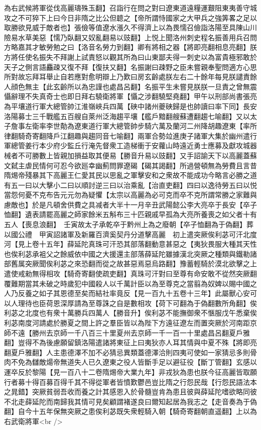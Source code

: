 為右武候將軍從伐高麗璹殊玉翻】召詣行在問之對曰遼東道遠糧運艱阻東夷善守城攻之不可猝下上曰今日非隋之比公但聼之【帝所謂恃國家之大甲兵之強筭畧之足以取勝欲見威于敵者也】張儉等值遼水漲久不得濟上以為畏懦召儉詣洛陽至具陳山川險易水草美惡【懦乃臥翻又奴亂翻易以豉翻】上悦上聞洛州刺史程名振善用兵召問方略嘉其才敏勞勉之曰【洛音名勞力到翻】卿有將相之器【將即亮翻相息亮翻】朕方將任使名振失不拜謝上試責怒以觀其所為曰山東鄙夫得一刺史以為富貴極邪敢於天子之側言語麤疎又復不拜【復扶又翻】名振謝曰疎野之臣未嘗親奉聖問適方心思所對故忘拜耳舉止自若應對愈明辯上乃歎曰房玄齡處朕左右二十餘年每見朕譴責餘人顔色無主【此玄齡所以為忠謹也處昌呂翻】名振平生未嘗見朕朕一旦責之曾無震懾辭理不失真奇士也即日拜右驍衛將軍【懾之涉翻驍堅堯翻】甲午以刑部尚書張亮為平壤道行軍大總管帥江淮嶺峽兵四萬【硤中諸州夔硤歸是也帥讀曰率下同】長安洛陽募士三千戰艦五百艘自萊州泛海趨平壤【艦戶黯翻艘蘇遭翻趨七喻翻】又以太子詹事左衛率李世勣為遼東道行軍大總管帥步騎六萬及蘭河二州降胡趣遼東【率所律翻騎奇寄翻降戶江翻趣與趨同音七喻翻】兩軍合勢竝進庚子諸軍大集於幽州遣行軍總管姜行本少府少監丘行淹先督衆工造梯衝于安蘿山時遠近勇士應募及獻攻城器械者不可勝數上皆親加損益取其便易【勝音升易以豉翻】又手詔諭天下以高麗蓋蘇文弑主虐民情何可忍今欲廵幸幽薊問罪遼碣【碣其謁翻】所過營頓無為勞費且言昔隋焬帝殘暴其下高麗王仁愛其民以思亂之軍擊安和之衆故不能成功今略言必勝之道有五一曰以大擊小二曰以順討逆三曰以治乘亂【治直吏翻】四曰以逸待勞五曰以悦當怨何憂不克布告元元勿為疑懼【太宗以高麗為必可克而卒不克所謂常勝之家難與慮敵也】於是凡頓舍供費之具减者大半十一月辛丑武陽懿公李大亮卒于長安【卒子恤翻】遺表請罷高麗之師家餘米五斛布三十匹親戚早孤為大亮所養喪之如父者十有五人【喪息浪翻】　壬寅故太子承乾卒于黔州上為之廢朝【卒子恤翻為于偽翻】葬以國公禮　甲寅詔諸軍及新羅百濟奚契丹分道擊高麗　初上遣突厥俟利苾可汗北度河【見上卷十五年】薛延陀真珠可汗恐其部落翻動意甚惡之【夷狄畏服大種其天性也俟利苾承袓父之餘威依中國之大援還主部落薛延陀雖據漢北突厥之種類與鐵勒諸部舊属突厥聞俟利苾之來恐翻而從之故甚惡焉惡烏路翻】豫蓄輕騎於漠北欲擊之上遣使戒勑無得相攻【騎奇寄翻使疏吏翻】真珠可汗對曰至尊有命安敢不從然突厥翻覆難期當其未破之時歲犯中國殺人以千萬計臣以為至尊克之當翦為奴婢以賜中國之人乃反養之如子其恩德至矣而結社率竟反【見一百九十五卷十三年】此屬獸心安可以人理待也臣荷恩深厚請為至尊誅之自是數相攻【荷下可翻為于偽翻數所角翻】俟利苾之北度也有衆十萬勝兵四萬人【勝音升】俟利苾不能撫御衆不愜服戊午悉棄俟利苾南度河請處於勝夏之間上許之羣臣皆以為陛下方遠征遼左而置突厥於河南距京師不遠【勝州去京師一千八百三十里夏州去京師一千一百一十里處昌呂翻夏戶雅翻】豈得不為後慮願留鎮洛陽遣諸將東征上曰夷狄亦人耳其情與中夏不殊【將即亮翻夏戶雅翻】人主患德澤不加不必猜忌異類蓋德澤洽則四夷可使如一家猜忌多則骨肉不免為讎敵煬帝無道失人已久遼東之役人皆斷手足以避征役【斷丁管翻】玄感以運卒反於黎陽【見一百八十二卷隋焬帝大業九年】非戎狄為患也朕今征高麗皆取願行者募十得百募百得千其不得從軍者皆憤歎鬱邑豈比隋之行怨民哉【行怨民語法本之晁錯】突厥貧弱吾收而養之計其感恩入於骨髓豈肯為患且彼與薛延陀嗜欲略同彼不北走薛延陀而南歸我其情可見矣顧謂褚遂良曰爾知起居為我志之【走音奏為于偽翻】自今十五年保無突厥之患俟利苾既失衆輕騎入朝【騎奇寄翻朝直遥翻】上以為右武衛將軍<br />
